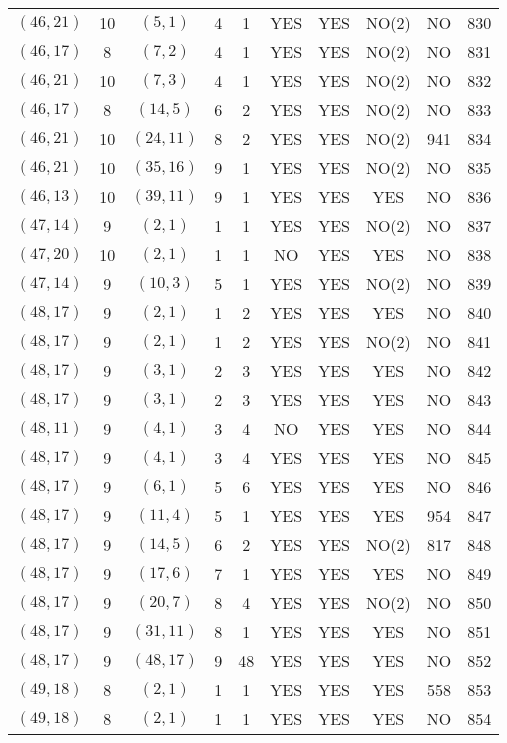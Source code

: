 \begin{longtable}{|c|c|c|c|c|c|c|c|c|c|}
$(46, 21)$ & 10 & $(5, 1)$ & 4 & 1 & YES & YES & NO(2) & NO & 830\\
$(46, 17)$ & 8 & $(7, 2)$ & 4 & 1 & YES & YES & NO(2) & NO & 831\\
$(46, 21)$ & 10 & $(7, 3)$ & 4 & 1 & YES & YES & NO(2) & NO & 832\\
$(46, 17)$ & 8 & $(14, 5)$ & 6 & 2 & YES & YES & NO(2) & NO & 833\\
$(46, 21)$ & 10 & $(24, 11)$ & 8 & 2 & YES & YES & NO(2) & 941 & 834\\
$(46, 21)$ & 10 & $(35, 16)$ & 9 & 1 & YES & YES & NO(2) & NO & 835\\
$(46, 13)$ & 10 & $(39, 11)$ & 9 & 1 & YES & YES & YES & NO & 836\\
$(47, 14)$ & 9 & $(2, 1)$ & 1 & 1 & YES & YES & NO(2) & NO & 837\\
$(47, 20)$ & 10 & $(2, 1)$ & 1 & 1 & NO & YES & YES & NO & 838\\
$(47, 14)$ & 9 & $(10, 3)$ & 5 & 1 & YES & YES & NO(2) & NO & 839\\
$(48, 17)$ & 9 & $(2, 1)$ & 1 & 2 & YES & YES & YES & NO & 840\\
$(48, 17)$ & 9 & $(2, 1)$ & 1 & 2 & YES & YES & NO(2) & NO & 841\\
$(48, 17)$ & 9 & $(3, 1)$ & 2 & 3 & YES & YES & YES & NO & 842\\
$(48, 17)$ & 9 & $(3, 1)$ & 2 & 3 & YES & YES & YES & NO & 843\\
$(48, 11)$ & 9 & $(4, 1)$ & 3 & 4 & NO & YES & YES & NO & 844\\
$(48, 17)$ & 9 & $(4, 1)$ & 3 & 4 & YES & YES & YES & NO & 845\\
$(48, 17)$ & 9 & $(6, 1)$ & 5 & 6 & YES & YES & YES & NO & 846\\
$(48, 17)$ & 9 & $(11, 4)$ & 5 & 1 & YES & YES & YES & 954 & 847\\
$(48, 17)$ & 9 & $(14, 5)$ & 6 & 2 & YES & YES & NO(2) & 817 & 848\\
$(48, 17)$ & 9 & $(17, 6)$ & 7 & 1 & YES & YES & YES & NO & 849\\
$(48, 17)$ & 9 & $(20, 7)$ & 8 & 4 & YES & YES & NO(2) & NO & 850\\
$(48, 17)$ & 9 & $(31, 11)$ & 8 & 1 & YES & YES & YES & NO & 851\\
$(48, 17)$ & 9 & $(48, 17)$ & 9 & 48 & YES & YES & YES & NO & 852\\
$(49, 18)$ & 8 & $(2, 1)$ & 1 & 1 & YES & YES & YES & 558 & 853\\
$(49, 18)$ & 8 & $(2, 1)$ & 1 & 1 & YES & YES & YES & NO & 854\\

\end{longtable}
